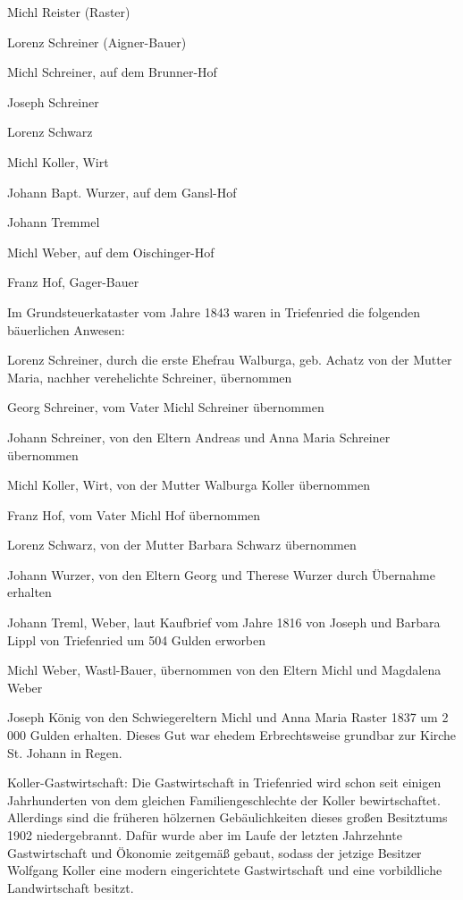 \documentclass[12pt,a4pager]{book}
\begin{document}
Michl Reister (Raster)

Lorenz Schreiner (Aigner-Bauer)

Michl Schreiner, auf dem Brunner-Hof

Joseph Schreiner

Lorenz Schwarz

Michl Koller, Wirt

Johann Bapt. Wurzer, auf dem Gansl-Hof

Johann Tremmel

Michl Weber, auf dem Oischinger-Hof

Franz Hof, Gager-Bauer

Im Grundsteuerkataster vom Jahre 1843 waren in Triefenried die folgenden
bäuerlichen Anwesen:

Lorenz Schreiner, durch die erste Ehefrau Walburga, geb. Achatz von der Mutter
Maria, nachher verehelichte Schreiner, übernommen

Georg Schreiner, vom Vater Michl Schreiner übernommen

Johann Schreiner, von den Eltern Andreas und Anna Maria Schreiner übernommen

Michl Koller, Wirt, von der Mutter Walburga Koller übernommen

Franz Hof, vom Vater Michl Hof übernommen

Lorenz Schwarz, von der Mutter Barbara Schwarz übernommen

Johann Wurzer, von den Eltern Georg und Therese Wurzer durch Übernahme erhalten

Johann Treml, Weber, laut Kaufbrief vom Jahre 1816 von Joseph und Barbara Lippl
von Triefenried um 504 Gulden erworben

Michl Weber, Wastl-Bauer, übernommen von den Eltern Michl und Magdalena Weber

Joseph König von den Schwiegereltern Michl und Anna Maria Raster 1837 um 2 000
Gulden erhalten. Dieses Gut war ehedem Erbrechtsweise grundbar zur Kirche St.
Johann in Regen.

Koller-Gastwirtschaft: Die Gastwirtschaft in Triefenried wird schon seit einigen
Jahrhunderten von dem gleichen Familiengeschlechte der Koller bewirtschaftet.
Allerdings sind die früheren hölzernen Gebäulichkeiten dieses großen Besitztums
1902 niedergebrannt. Dafür wurde aber im Laufe der letzten Jahrzehnte
Gastwirtschaft und Ökonomie zeitgemäß gebaut, sodass der jetzige Besitzer
Wolfgang Koller eine modern eingerichtete Gastwirtschaft und eine vorbildliche
Landwirtschaft besitzt.
\end{document}
